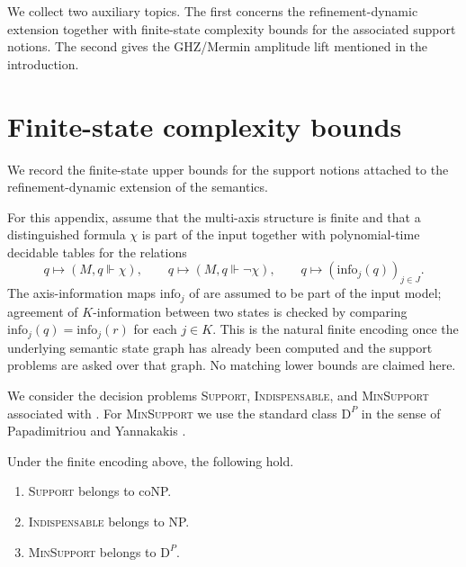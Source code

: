 \appendix

We collect two auxiliary topics. The first concerns the refinement-dynamic extension together with finite-state complexity bounds for the associated support notions. The second gives the GHZ/Mermin amplitude lift mentioned in the introduction.
\section{Finite-state complexity bounds}\label{sec:appendix-complexity}

We record the finite-state upper bounds for the support notions attached to the refinement-dynamic extension of the semantics.

For this appendix, assume that the multi-axis structure is finite and that a distinguished formula $\chi$ is part of the input together with polynomial-time decidable tables for the relations
\[
q\mapsto (M,q\Vdash\chi),
\qquad
q\mapsto (M,q\Vdash\neg\chi),
\qquad
q\mapsto (\mathrm{info}_j(q))_{j\in J}.
\]
The axis-information maps $\mathrm{info}_j$ of  are assumed to be part of the input model; agreement of $K$-information between two states is checked by comparing $\mathrm{info}_j(q)=\mathrm{info}_j(r)$ for each $j\in K$. This is the natural finite encoding once the underlying semantic state graph has already been computed and the support problems are asked over that graph. No matching lower bounds are claimed here.

We consider the decision problems \textup{\textsc{Support}}, \textup{\textsc{Indispensable}}, and \textup{\textsc{MinSupport}} associated with . For \textup{\textsc{MinSupport}} we use the standard class $\mathrm{D}^P$ in the sense of Papadimitriou and Yannakakis \cite{PapadimitriouYannakakis1984}.

\begin{proposition}\label{thm:axis-complexity-upper-bounds}
Under the finite encoding above, the following hold.
\begin{enumerate}[label=(\roman*),nosep]
\item \textup{\textsc{Support}} belongs to coNP.
\item \textup{\textsc{Indispensable}} belongs to NP.
\item \textup{\textsc{MinSupport}} belongs to $\mathrm{D}^P$.
\end{enumerate}
\end{proposition}

